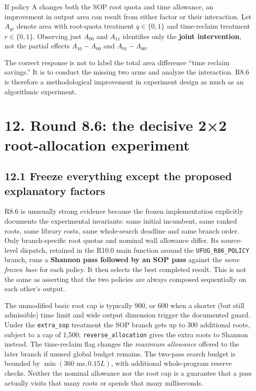 If policy A changes both the SOP root quota and time allowance, an improvement in output area can result from either factor or their interaction. Let \(A_{qr}\) denote area with root-quota treatment \(q\in\{0,1\}\) and time-reclaim treatment \(r\in\{0,1\}\). Observing just \(A_{00}\) and \(A_{11}\) identifies only the \textbf{joint intervention}, not the partial effects \(A_{10}-A_{00}\) and \(A_{01}-A_{00}\).

The correct response is not to label the total area difference ``time reclaim savings.'' It is to conduct the missing two arms and analyze the interaction. R8.6 is therefore a methodological improvement in experiment design as much as an algorithmic experiment.

\section{12. Round 8.6: the decisive 2×2 root-allocation experiment}\label{round-8.6-the-decisive-22-root-allocation-experiment}

\subsection{12.1 Freeze everything except the proposed explanatory factors}\label{freeze-everything-except-the-proposed-explanatory-factors}

R8.6 is unusually strong evidence because the frozen implementation explicitly documents the experimental invariants: same initial incumbent, same ranked roots, same library costs, same whole-search deadline and same branch order. Only branch-specific root quotas and nominal wall allowance differ. Its source-level dispatch, retained in the R10.0 main function around the \texttt{UFUG\_R86\_POLICY} branch, runs a \textbf{Shannon pass followed by an SOP pass} against the \emph{same frozen base} for each policy. It then selects the best completed result. This is not the same as asserting that the two policies are always composed sequentially on each other's output.

The unmodified basic root cap is typically 900, or 600 when a shorter (but still admissible) time limit and wide output dimension trigger the documented guard. Under the \texttt{extra\_sop} treatment the SOP branch gets up to 300 additional roots, subject to a cap of 1,500; \texttt{reverse\_allocation} gives the extra roots to Shannon instead. The time-reclaim flag changes the \emph{maximum allowance} offered to the later branch if unused global budget remains. The two-pass search budget is bounded by \(\min(360\text{ ms},0.15L)\), with additional whole-program reserve checks. Neither the nominal allowance nor the root cap is a guarantee that a pass actually visits that many roots or spends that many milliseconds.

